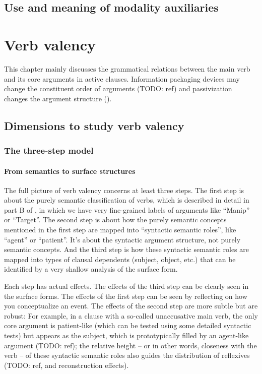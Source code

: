 \documentclass[UTF8, a4paper, oneside, scheme=plain]{ctexrep}
\begin{document}
\section{Use and meaning of modality auxiliaries}\label{sec:verb-inflection.modal-use}


\chapter{Verb valency}\label{chap:valency}

This chapter mainly discusses the grammatical relations between the main verb and its core arguments 
in active clauses.
Information packaging devices may change the constituent order of arguments (TODO: ref)
and passivization changes the argument structure (). 

\section{Dimensions to study verb valency}\label{sec:valency.overview}

\subsection{The three-step model}\label{sec:valency.overview.steps}

\subsubsection{From semantics to surface structures}

The full picture of verb valency concerns at least three steps.
The first step is about the purely semantic classification of verbs,
which is described in detail in part B of \citet{dixon2005semantic},
in which we have very fine-grained labels of arguments like ``Manip'' or ``Target''.
The second step is about how the purely semantic concepts mentioned in the first step 
are mapped into ``syntactic semantic roles'',
like ``agent'' or ``patient''.
It's about the syntactic argument structure, 
not purely semantic concepts.
And the third step is how these syntactic semantic roles are mapped into 
types of clausal dependents (subject, object, etc.) 
that can be identified by a very shallow analysis of the surface form.

Each step has actual effects.
The effects of the third step can be clearly seen in the surface forms.
The effects of the first step can be seen by reflecting on how you conceptualize an event.
The effects of the second step are more subtle but are robust:
For example, in a clause with a so-called unaccusative main verb,
the only core argument is patient-like (which can be tested using some detailed syntactic tests)
but appears as the subject,
which is prototypically filled by an agent-like argument (TODO: ref);
the relative height -- or in other words, closeness with the verb -- of these syntactic semantic roles 
also guides the distribution of reflexives (TODO: ref, and reconstruction effects).
\end{document}
